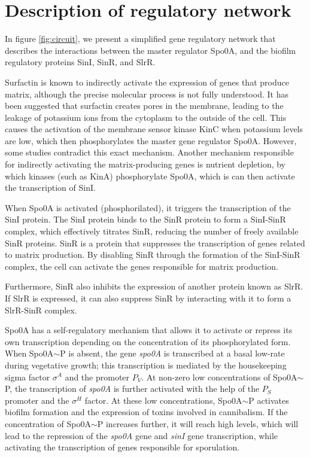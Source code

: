 


\section{Description of regulatory network}\label{sec:litrev:theme2}

In figure \ref{fig:circuit}, we present a simplified gene regulatory network that describes the interactions
between the master regulator Spo0A, and the biofilm regulatory proteins SinI, SinR, and SlrR.

Surfactin is known to indirectly activate the expression of genes that produce matrix,
 although the precise molecular process is not fully understood. It has been suggested that 
 surfactin creates pores in the membrane, leading to the leakage of potassium ions from the cytoplasm
  to the outside of the cell. This causes the activation of the membrane sensor kinase KinC when potassium 
  levels are low, which then phosphorylates the master gene regulator Spo0A{\footnotesize\cite{Lpez20091}}. However, some studies contradict this exact mechanism.{\footnotesize\cite{Devi2015}}
Another mechanism responsible for indirectly activating the matrix-producing genes
is nutrient depletion, by which kinases (such as KinA) phosphorylate Spo0A, which is can then 
activate the transcription of SinI.

When Spo0A is activated (phosphorilated), it triggers the transcription of the SinI protein. The SinI protein binds to the SinR protein to form a SinI-SinR complex, which effectively titrates SinR, reducing the number of freely available SinR proteins. SinR is a protein that suppresses the transcription of genes related to matrix production. By disabling SinR through the formation of the SinI-SinR complex, the cell can activate the genes responsible for matrix production.{\footnotesize\cite{Chai2011}}

Furthermore, SinR also inhibits the expression of another protein known as SlrR. If SlrR is expressed, it can also suppress SinR by interacting with it to form a SlrR-SinR complex.{\footnotesize\cite{Chai2011}}

Spo0A has a self-regulatory mechanism that allows it to activate or repress its own transcription
depending on the concentration of its phosphorylated form.
 When Spo0A$\sim$P is absent, the gene \textit{spo0A} is transcribed at a basal low-rate during vegetative growth; 
 this transcription is mediated by the housekeeping sigma factor \(\sigma^A\) and the promoter \textit{$P_V$}.
 At non-zero low concentrations of Spo0A$\sim$P, the transcription of \textit{spo0A} is further activated
 with the help of the \textit{$P_S$} promoter and the \(\sigma^H\) factor. At these low concentrations, Spo0A$\sim$P activates
 biofilm formation and the expression of toxins involved in cannibalism. If the concentration of Spo0A$\sim$P increases further, 
 it will reach high levels, which will lead to the repression of the \textit{spo0A} gene and \textit{sinI} gene
 transcription, while activating the transcription of genes responsible for sporulation.

